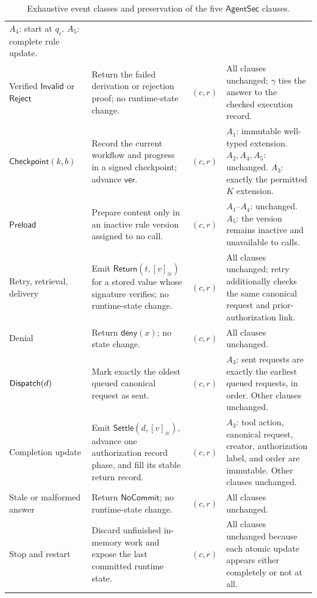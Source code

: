 \begin{table}[t]
\begin{tabular}{@{}p{}p{}p{}p{}@{}}
\(A_4\): start at \(q_\epsilon\).
\(A_5\): complete rule update.\\
Verified \(\mathsf{Invalid}\) or \(\mathsf{Reject}\) &
Return the failed derivation or rejection proof; no runtime-state change. &
\((c,r)\) &
All clauses unchanged; \(\gamma\) ties the answer to the checked execution record.\\
\(\mathsf{Checkpoint}(k,b)\) &
Record the current workflow and progress in a signed checkpoint; advance \(\mathsf{ver}\). &
\((c,r)\) &
\(A_1\): immutable well-typed extension.
\(A_2,A_4,A_5\): unchanged.
\(A_3\): exactly the permitted \(K\) extension.\\
\(\mathsf{Preload}\) &
Prepare content only in an inactive rule version assigned to no call. &
\((c,r)\) &
\(A_1\)--\(A_4\): unchanged.
\(A_5\): the version remains inactive and unavailable to calls.\\
Retry, retrieval, delivery &
Emit \(\mathsf{Return}(t,[v]_{\cong})\) for a stored value whose signature verifies; no runtime-state change. &
\((c,r)\) &
All clauses unchanged; retry additionally checks the same canonical request and prior-authorization link.\\
Denial &
Return \(\mathsf{deny}(x)\); no state change. &
\((c,r)\) &
All clauses unchanged.\\
\(\mathsf{Dispatch}(d)\) &
Mark exactly the oldest queued canonical request as sent. &
\((c,r)\) &
\(A_3\): sent requests are exactly the earliest queued requests, in order.
Other clauses unchanged.\\
Completion update &
Emit \(\mathsf{Settle}(d,[v]_{\cong})\), advance one authorization record phase, and fill its stable return record. &
\((c,r)\) &
\(A_3\): tool action, canonical request, creator, authorization label, and order are immutable.
Other clauses unchanged.\\
Stale or malformed answer &
Return \(\mathsf{NoCommit}\); no runtime-state change. &
\((c,r)\) &
All clauses unchanged.\\
Stop and restart &
Discard unfinished in-memory work and expose the last committed runtime state. &
\((c,r)\) &
All clauses unchanged because each atomic update appears either completely or not at all.\\
\bottomrule
\end{tabular}
\caption{Exhaustive event classes and preservation of the five \(\mathsf{AgentSec}\) clauses.}
\label{tab:app-event-matrix}
\end{table}

